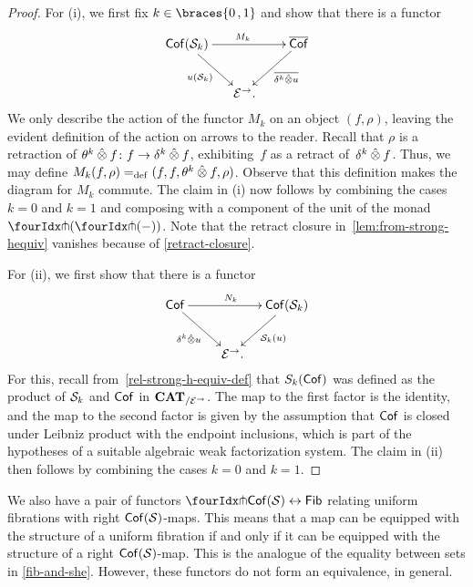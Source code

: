 \documentclass[reqno,10pt,a4paper,oneside,draft]{amsart}
\begin{document}
{{\begin{proof} For (i), we first fix $k \in \braces{0 \, , 1 }$ and show that there is a functor
\begin{equation}
\label{lem:from-strong-hequiv}
\begin{gathered}
\xymatrix@!C@C-2em{
 \Cof( \cal{S}_k)
  \ar[dr]_{u(\cal{S}_k)}
  \ar[rr]^{M_k}
&&
  \overline{\Cof}
  \ar[dl]^-{\overline{\kcyl \hatotimes u}}
\\&
  \catE^\to
\rlap{.}}
\end{gathered}
\end{equation}
We only describe the action of the functor $M_k$ on an object $(f, \rho)$, leaving the evident definition of the action on arrows to the reader.
Recall that $\rho$ is a retraction of $\thetak \hatotimes f \co f \to \kcyl \hatotimes f$, exhibiting~$f$ as a retract of~$\kcyl \hatotimes f$.
Thus, we may define $M_k(f, \rho) \defeq (f, f, \thetak \hatotimes f, \rho)$.
Observe that this definition makes the diagram for $M_k$ commute. The claim in (i) now follows by combining 
the cases $k = 0$ and $k = 1$ and composing with a component of the unit of the monad $\liftl{(\liftr{(-)})}$.
Note that the retract closure in~\eqref{lem:from-strong-hequiv} vanishes because of \cref{retract-closure}.


For (ii), we first show that there is a functor
\[
\xymatrix@!C@C-2em{
  \Cof
  \ar[dr]_{\kcyl \hatotimes u} \ar[rr]^{N_k}
&&
  \Cof(\cal{S}_k)
  \ar[dl]^{\cal{S}_k(u)}
\\&
   \catE^\to
\rlap{.}}
\]
For this, recall from~\eqref{rel-strong-h-equiv-def} that $S_k(\Cof)$ was defined as the product of $\cal{S}_k$ and $\Cof$  
in $\CAT_{/\cal{E}^\to}$. The map to the first factor is the identity, and the map to the second factor is given by the assumption that $\Cof$ is closed under Leibniz product with the endpoint inclusions, which is part of the hypotheses of a suitable algebraic weak factorization system.
The claim in (ii) then follows by combining the cases $k = 0$ and $k = 1$.
\end{proof}



\begin{remark} \label{relating-strong-hequiv-and-uniform-fib}
We also have a pair of functors $\liftr{\Cof(\cal{S})} \leftrightarrow \Fib$ relating uniform fibrations with right $\Cof(\cal{S})$-maps. This means that a map can be equipped with the
structure of a uniform fibration if and only if it can be equipped with the structure of a right $\Cof(\cal{S})$-map. This is the analogue of the equality between sets in \cref{fib-and-she}.
However, these functors do not form an equivalence, in general.
\end{remark}

}}
\end{document}
